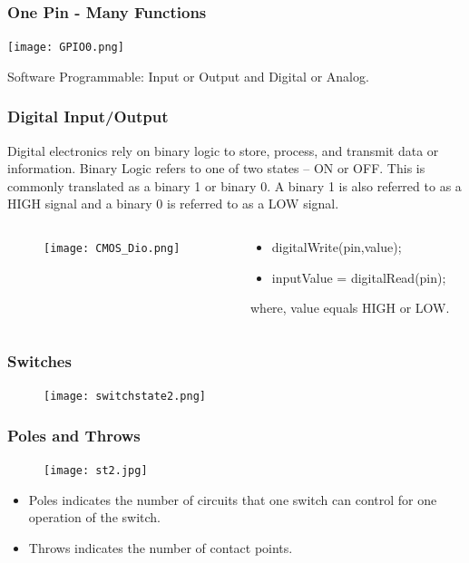 \documentclass{beamer}
\begin{document}
\begin{frame}\frametitle{One Pin - Many Functions}
\begin{center}
\texttt{[image: GPIO0.png]}

\vspace{0.25cm}
Software Programmable: Input or Output and Digital or Analog.
\end{center}
\end{frame}

\begin{frame}
\frametitle{Digital Input/Output}
Digital electronics rely on binary logic to store, process, and transmit data or information. Binary Logic refers to one of two states -- ON or OFF. This is commonly translated as a binary 1 or binary 0. A binary 1 is also referred to as a HIGH signal and a binary 0 is referred to as a LOW signal.
\begin{columns}
\begin{column}{3cm}
\begin{figure}
	\texttt{[image: CMOS\_Dio.png]}
\end{figure}
\end{column}
\begin{column}{6cm}
\begin{itemize}
\item digitalWrite(pin,value);
\item inputValue = digitalRead(pin);
\end{itemize}

\vspace{0.5cm}
where, value equals HIGH or LOW.
\end{column}
\end{columns}
\end{frame}

\begin{frame}\frametitle{Switches}
\begin{figure}[h]
	\texttt{[image: switchstate2.png]}
\end{figure}
\end{frame}

\begin{frame}\frametitle{Poles and Throws}
\begin{figure}[h]
	\texttt{[image: st2.jpg]}
\end{figure}
\begin{itemize}
\item Poles indicates the number of circuits that one switch can control for one operation of the switch. 
\item Throws indicates the number of contact points.
\end{itemize}
\end{frame}
\end{document}

